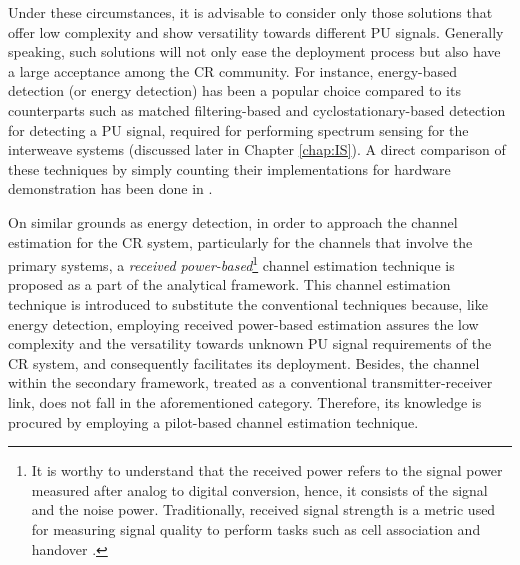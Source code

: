 Under these circumstances, it is advisable to consider only those solutions that offer low complexity and show versatility towards different PU signals. Generally speaking, such solutions will not only ease the deployment process but also have a large acceptance among the CR community. For instance, energy-based detection (or energy detection) has been a popular choice compared to its counterparts such as matched filtering-based and cyclostationary-based detection for detecting a PU signal, required for performing spectrum sensing for the interweave systems (discussed later in Chapter \ref{chap:IS}). A direct comparison of these techniques by simply counting their implementations for hardware demonstration has been done in \cite{Pawe11}. 

On similar grounds as energy detection, in order to approach the channel estimation for the CR system, particularly for the channels that involve the primary systems, a \textit{received power-based}\footnote{It is worthy to understand that the received power refers to the signal power measured after analog to digital conversion, hence, it consists of the signal and the noise power. Traditionally, received signal strength is a metric used for measuring signal quality to perform tasks such as cell association and handover \cite{Boga16}.} channel estimation technique is proposed as a part of the analytical framework. This channel estimation technique is introduced to substitute the conventional techniques because, like energy detection, employing received power-based estimation assures the low complexity and the versatility towards unknown PU signal requirements of the CR system, and consequently facilitates its deployment. Besides, the channel within the secondary framework, treated as a conventional transmitter-receiver link, does not fall in the aforementioned category. Therefore, its knowledge is procured by employing a pilot-based channel estimation technique.

